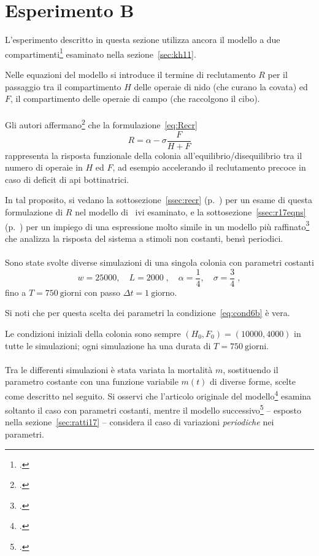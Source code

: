 \section{Esperimento B}
L'esperimento descritto in questa sezione utilizza ancora il modello a due compartimenti\footcite{khoury2011}
esaminato nella sezione~\ref{sec:kh11}.

Nelle equazioni del modello si introduce il termine di reclutamento $R$ per il passaggio tra il compartimento $H$ delle
operaie di nido (che curano la covata) ed $F$, il compartimento delle operaie di campo (che raccolgono il cibo).

\paragraph{}
Gli autori affermano\footcite[2,3]{khoury2011} che la formulazione~\eqref{eq:Recr}
$$R = \alpha - \sigma \frac{F}{H+F}$$
rappresenta la risposta funzionale della colonia all'equilibrio/disequilibrio tra il numero di operaie in $H$ ed $F$,
ad esempio accelerando il reclutamento precoce in caso di deficit di api bottinatrici.

In tal proposito, si vedano la sottosezione~\ref{ssec:recr} (p.~\pageref{ssec:recr}) per un esame di questa formulazione
di $R$ nel modello di~\citeauthor{khoury2011} ivi esaminato, e la sottosezione~\ref{ssec:r17eqns}
(p.~\pageref{ssec:r17eqns})
per un impiego di una espressione molto simile in un modello più raffinato\footcite{ratti2017} che analizza
la risposta del sistema a stimoli non costanti, bensì periodici.

\paragraph{}
Sono state svolte diverse simulazioni di una singola colonia con parametri costanti
$$w= 25000, \quad L=2000 \; , \quad \alpha=\frac{1}{4}, \quad \sigma= \frac{3}{4} \; ,$$
fino a $T=750~\text{giorni}$ con passo $\Delta t = 1~\text{giorno}$.

Si noti che per questa scelta dei parametri la condizione~\eqref{eq:cond6b} è vera.

Le condizioni iniziali della colonia sono sempre $(H_0, F_0) = (10000, 4000)$ in tutte le simulazioni;
ogni simulazione ha una durata di $T=750~\text{giorni}$.

\paragraph{}
Tra le differenti simulazioni è stata variata la mortalità $m$, sostituendo il parametro costante
con una funzione variabile $m(t)$ di diverse forme, scelte come descritto nel seguito.
Si osservi che l'articolo originale del modello\footcite{khoury2011} esamina soltanto il caso con parametri costanti,
mentre il modello successivo\footcite{ratti2017} -- esposto nella sezione~\ref{sec:ratti17} -- considera il caso
di variazioni \emph{periodiche} nei parametri.

